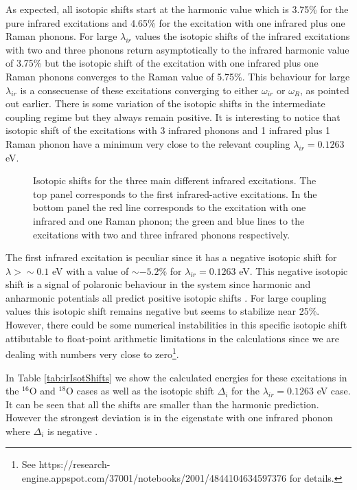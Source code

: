 As expected, all isotopic shifts start at the harmonic value which is 3.75\% for the pure infrared excitations and 4.65\% for the excitation with one infrared plus one Raman phonons.
For large $\lambda_{ir}$ values the isotopic shifts of the infrared excitations with two and three phonons return asymptotically to the infrared harmonic value of 3.75\% but the isotopic shift of the excitation with one infrared plus one Raman phonons converges to the Raman value of 5.75\%.
This behaviour for large $\lambda_{ir}$ is a consecuense of these excitations converging to either $\omega_{ir}$ or $\omega_R$, as pointed out earlier.
There is some variation of the isotopic shifts in the intermediate coupling regime but they always remain positive.
It is interesting to notice that isotopic shift of the excitations with 3 infrared phonons and 1 infrared plus 1 Raman phonon have a minimum very close to the relevant coupling $\lambda_{ir}=0.1263$ eV.
%
\begin{figure}[ht]
  \centering
  
  \caption[Isotopic shifts for the different infrared excitations.]
  {Isotopic shifts for the three main different infrared excitations.
  The top panel corresponds to the first infrared-active excitations.
  In the bottom panel the red line corresponds to the excitation with one infrared and one Raman phonon; the green and blue lines to the excitations with two and three infrared phonons respectively.}
  \label{fig:irIsot}
\end{figure}

The first infrared excitation is peculiar since it has a negative isotopic shift for $\lambda > \sim 0.1$ eV with a value of $\sim -5.2$\% for $\lambda_{ir}=0.1263$ eV.
This negative isotopic shift is a signal of polaronic behaviour in the system since harmonic and anharmonic potentials all predict positive isotopic shifts \cite{MustredeLeon2000,Pali1998}.
For large coupling values this isotopic shift remains negative but seems to stabilize near 25\%.
However, there could be some numerical instabilities in this specific isotopic shift attibutable to float-point arithmetic limitations in the calculations since we are dealing with numbers very close to zero\footnote{See https://research-engine.appspot.com/37001/notebooks/2001/4844104634597376 for details.}.

In Table \ref{tab:irIsotShifts} we show the calculated energies for these excitations in the $^{16}$O and $^{18}$O cases as well as the isotopic shift $\Delta_i$ for the $\lambda_{ir}=0.1263$ eV case. It can be seen that all the shifts are smaller than the harmonic prediction. However the strongest deviation is in the eigenstate with one infrared phonon where $\Delta_i$ is negative \cite{GarciaSaraviaOrtizdeMontellano2014}.
 
